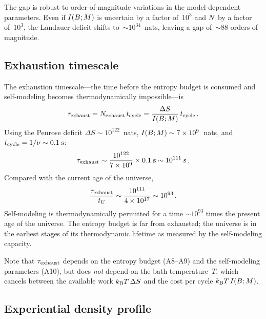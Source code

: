 The gap is robust to order-of-magnitude variations in the
model-dependent parameters.  Even if $I(B;M)$ is uncertain by a
factor of~$10^3$ and $N$~by a factor of~$10^3$, the Landauer deficit
shifts to~$\sim\!10^{34}$~nats, leaving a gap of~$\sim\!88$ orders
of magnitude.

\subsection{Exhaustion timescale}\label{sec:exhaust-time}

The exhaustion timescale---the time before the entropy budget is
consumed and self-modeling becomes thermodynamically impossible---is
\begin{equation}
  \tau_{\mathrm{exhaust}} = N_{\mathrm{exhaust}}\,t_{\mathrm{cycle}}
  = \frac{\Delta S}{I(B;M)}\,t_{\mathrm{cycle}} \,.
  \label{eq:tau-exhaust}
\end{equation}
Using the Penrose deficit $\Delta S \sim 10^{122}$~nats,
$I(B;M) \sim 7\times 10^{9}$~nats, and
$t_{\mathrm{cycle}} = 1/\nu \sim 0.1\;\text{s}$:
\begin{equation}
  \tau_{\mathrm{exhaust}} \sim \frac{10^{122}}{7\times 10^{9}}
    \times 0.1\;\text{s}
  \sim 10^{111}\;\text{s}\,.
  \label{eq:tau-value}
\end{equation}
Compared with the current age of the universe,
\begin{equation}
  \frac{\tau_{\mathrm{exhaust}}}{t_U} \sim \frac{10^{111}}{4\times 10^{17}}
  \sim 10^{93}\,.
  \label{eq:tau-ratio}
\end{equation}
Self-modeling is thermodynamically permitted for a time
$\sim\!10^{93}$ times the present age of the universe.  The entropy
budget is far from exhausted; the universe is in the earliest stages
of its thermodynamic lifetime as measured by the self-modeling
capacity.

Note that $\tau_{\mathrm{exhaust}}$ depends on the entropy budget (A8--A9) and the
self-modeling parameters (A10), but does \emph{not} depend on the
bath temperature~$T$, which cancels between the available work
$k_{\mathrm{B}} T\,\Delta S$ and the cost per cycle $k_{\mathrm{B}} T\,I(B;M)$.

\subsection{Experiential density profile}\label{sec:rho-profile}

